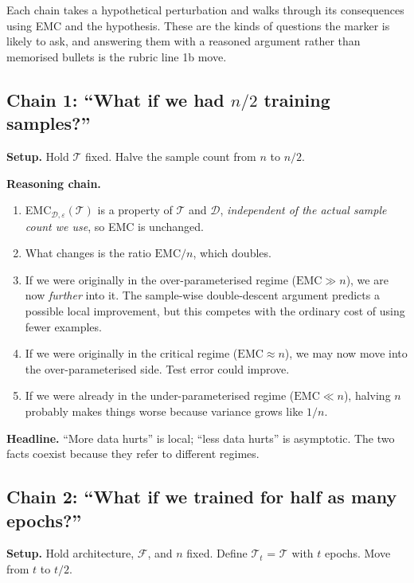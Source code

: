 \documentclass[11pt,a4paper]{article}
\newcommand{\T}{\mathcal{T}}
\newcommand{\D}{\mathcal{D}}
\newcommand{\F}{\mathcal{F}}
\theoremstyle{definition}
\begin{document}
Each chain takes a hypothetical perturbation and walks through its consequences using EMC and the hypothesis. These are the kinds of questions the marker is likely to ask, and answering them with a reasoned argument rather than memorised bullets is the rubric line 1b move.

\subsection{Chain 1: ``What if we had $n/2$ training samples?''}

\textbf{Setup.} Hold $\T$ fixed. Halve the sample count from $n$ to $n/2$.

\textbf{Reasoning chain.}
\begin{enumerate}[leftmargin=1.4em]
\item EMC$_{\D,\varepsilon}(\T)$ is a property of $\T$ and $\D$, \emph{independent of the actual sample count we use}, so EMC is unchanged.
\item What changes is the ratio $\mathrm{EMC}/n$, which doubles.
\item If we were originally in the over-parameterised regime ($\mathrm{EMC} \gg n$), we are now \emph{further} into it. The sample-wise double-descent argument predicts a possible local improvement, but this competes with the ordinary cost of using fewer examples.
\item If we were originally in the critical regime ($\mathrm{EMC}\approx n$), we may now move into the over-parameterised side. Test error could improve.
\item If we were already in the under-parameterised regime ($\mathrm{EMC}\ll n$), halving $n$ probably makes things worse because variance grows like $1/n$.
\end{enumerate}

\textbf{Headline.} ``More data hurts'' is local; ``less data hurts'' is asymptotic. The two facts coexist because they refer to different regimes.

\subsection{Chain 2: ``What if we trained for half as many epochs?''}

\textbf{Setup.} Hold architecture, $\F$, and $n$ fixed. Define $\T_t$ = $\T$ with $t$ epochs. Move from $t$ to $t/2$.
\end{document}
